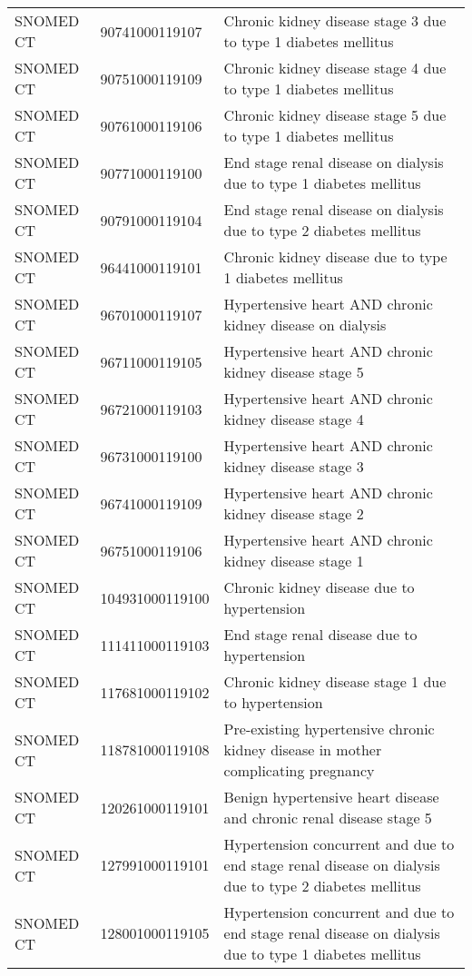 \begin{table}[ht]
\begin{tabular}{lll}
  SNOMED CT & 90741000119107 & Chronic kidney disease stage 3 due to type 1 diabetes mellitus \\ 
  SNOMED CT & 90751000119109 & Chronic kidney disease stage 4 due to type 1 diabetes mellitus \\ 
  SNOMED CT & 90761000119106 & Chronic kidney disease stage 5 due to type 1 diabetes mellitus \\ 
  SNOMED CT & 90771000119100 & End stage renal disease on dialysis due to type 1 diabetes mellitus \\ 
  SNOMED CT & 90791000119104 & End stage renal disease on dialysis due to type 2 diabetes mellitus \\ 
  SNOMED CT & 96441000119101 & Chronic kidney disease due to type 1 diabetes mellitus \\ 
  SNOMED CT & 96701000119107 & Hypertensive heart AND chronic kidney disease on dialysis \\ 
  SNOMED CT & 96711000119105 & Hypertensive heart AND chronic kidney disease stage 5 \\ 
  SNOMED CT & 96721000119103 & Hypertensive heart AND chronic kidney disease stage 4 \\ 
  SNOMED CT & 96731000119100 & Hypertensive heart AND chronic kidney disease stage 3 \\ 
  SNOMED CT & 96741000119109 & Hypertensive heart AND chronic kidney disease stage 2 \\ 
  SNOMED CT & 96751000119106 & Hypertensive heart AND chronic kidney disease stage 1 \\ 
  SNOMED CT & 104931000119100 & Chronic kidney disease due to hypertension \\ 
  SNOMED CT & 111411000119103 & End stage renal disease due to hypertension \\ 
  SNOMED CT & 117681000119102 & Chronic kidney disease stage 1 due to hypertension \\ 
  SNOMED CT & 118781000119108 & Pre-existing hypertensive chronic kidney disease in mother complicating pregnancy \\ 
  SNOMED CT & 120261000119101 & Benign hypertensive heart disease and chronic renal disease stage 5 \\ 
  SNOMED CT & 127991000119101 & Hypertension concurrent and due to end stage renal disease on dialysis due to type 2 diabetes mellitus \\ 
  SNOMED CT & 128001000119105 & Hypertension concurrent and due to end stage renal disease on dialysis due to type 1 diabetes mellitus \\ 

\end{tabular}
\end{table}
